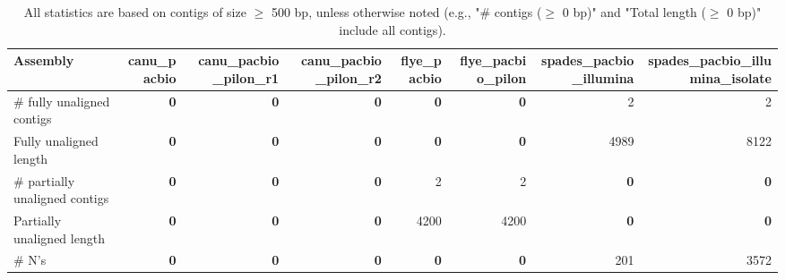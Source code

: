 \documentclass[12pt,a4paper]{article}
\begin{document}
\begin{table}[ht]
\begin{center}
\caption{All statistics are based on contigs of size $\geq$ 500 bp, unless otherwise noted (e.g., "\# contigs ($\geq$ 0 bp)" and "Total length ($\geq$ 0 bp)" include all contigs).}
\begin{tabular}{|l*{7}{|r}|}
\hline
Assembly & canu\_pacbio & canu\_pacbio\_pilon\_r1 & canu\_pacbio\_pilon\_r2 & flye\_pacbio & flye\_pacbio\_pilon & spades\_pacbio\_illumina & spades\_pacbio\_illumina\_isolate \\ \hline
\# fully unaligned contigs & {\bf 0} & {\bf 0} & {\bf 0} & {\bf 0} & {\bf 0} & 2 & 2 \\ \hline
Fully unaligned length & {\bf 0} & {\bf 0} & {\bf 0} & {\bf 0} & {\bf 0} & 4989 & 8122 \\ \hline
\# partially unaligned contigs & {\bf 0} & {\bf 0} & {\bf 0} & 2 & 2 & {\bf 0} & {\bf 0} \\ \hline
Partially unaligned length & {\bf 0} & {\bf 0} & {\bf 0} & 4200 & 4200 & {\bf 0} & {\bf 0} \\ \hline
\# N's & {\bf 0} & {\bf 0} & {\bf 0} & {\bf 0} & {\bf 0} & 201 & 3572 \\ \hline
\end{tabular}
\end{center}
\end{table}
\end{document}
